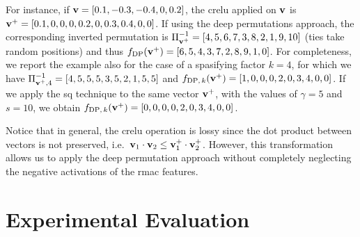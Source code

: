For instance, if $\mathbf{v} = [0.1, -0.3, -0.4, 0, 0.2]$, the \gls{crelu} applied on $\mathbf{v}$ is $\mathbf{v}^+ = [0.1, 0, 0, 0, 0.2, 0, 0.3, 0.4, 0, 0]$.
If using the deep permutations approach, the corresponding inverted permutation is $\Pi^{-1}_{\mathbf{v}^+} = [4, 5, 6, 7, 3, 8, 2, 1, 9, 10]$ (ties take random positions) and thus $f_\text{DP}(\mathbf{v}^+) = [6, 5, 4, 3, 7, 2, 8, 9, 1, 0]$.
For completeness, we report the example also for the case of a spasifying factor $k=4$, for which we have $\Pi^{-1}_{\mathbf{v}^+,4} = [4, 5, 5, 5, 3, 5, 2, 1, 5, 5]$ and $f_{\text{DP},\, k}(\mathbf{v}^+) = [1, 0, 0, 0, 2, 0, 3, 4, 0, 0]$.
If we apply the \gls{sq} technique to the same vector $\mathbf{v}^+$, with the values of $\gamma = 5$ and $s=10$, we obtain $f_{\text{DP}, \, k}(\mathbf{v}^+) = [0, 0, 0, 0, 2, 0, 3, 4, 0, 0]$. %

Notice that in general, the \gls{crelu} operation is lossy since the dot product between vectors is not preserved, i.e.\ $\mathbf{v}_1 \cdot \mathbf{v}_2 \leq \mathbf{v}_1^+ \cdot \mathbf{v}_2^+$.
However, this transformation allows us to apply the deep permutation approach without completely neglecting the negative activations of the \gls{rmac} features.

\section{Experimental Evaluation}
\label{sec:str:experiments}

